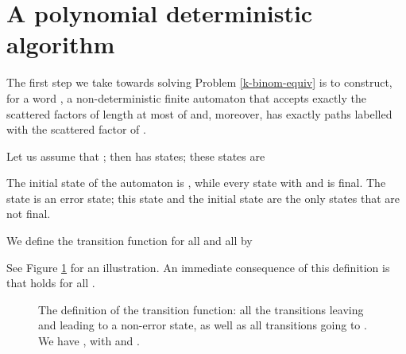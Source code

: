 \documentclass[runningheads]{llncs}
\begin{document}
\section{A polynomial deterministic algorithm}

The first step we take towards solving Problem \ref{k-binom-equiv} is to construct, for a word , a non-deterministic finite automaton  that accepts exactly the scattered factors of length at most  of  and, moreover, has exactly  paths labelled with the scattered factor  of . 

Let us assume that ; then  has  states; these states are 
 
The initial state of the automaton is , while every state  with  and  is final. The state  is an error state; this state and the initial state are the only states that are not final.

We define the transition function  for all  and all  by

See Figure \ref{fig1} for an illustration. An immediate consequence of this definition is that   holds for all .
\begin{figure}
\begin{center}
\end{center}
\caption{The definition of the transition function: all the transitions leaving  and leading to a non-error state, as well as all transitions going to . We have , with  and .
}
\label{fig1}
\end{figure}
\end{document}
